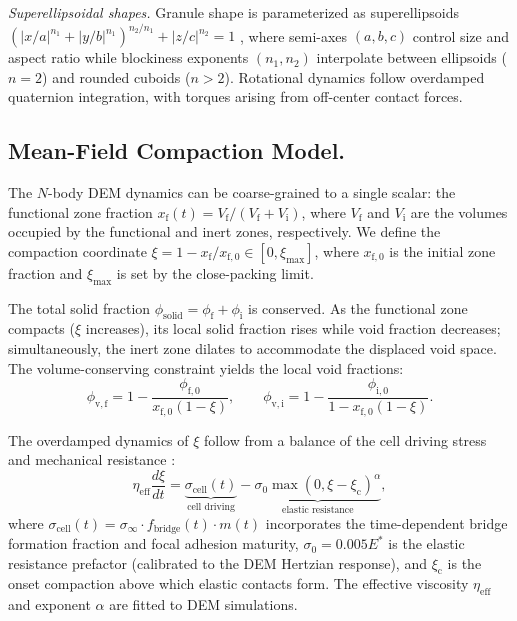 \documentclass[9pt,twocolumn,twoside]{pnas-new}
\newcommand{\phif}{\phi_\mathrm{f}}
\newcommand{\phii}{\phi_\mathrm{i}}
\newcommand{\xf}{x_\mathrm{f}}
\newcommand{\sigmacell}{\sigma_\mathrm{cell}}
\newcommand{\sigmazero}{\sigma_0}
\newcommand{\etaeff}{\eta_\mathrm{eff}}
\begin{document}
\textit{Superellipsoidal shapes.}
Granule shape is parameterized as superellipsoids
$\left(|x/a|^{n_1} + |y/b|^{n_1}\right)^{n_2/n_1} + |z/c|^{n_2} = 1$
\cite{Liu2025,Yuan2019}, where semi-axes $(a, b, c)$ control size and aspect
ratio while blockiness exponents $(n_1, n_2)$ interpolate between ellipsoids
($n = 2$) and rounded cuboids ($n > 2$). Rotational dynamics follow
overdamped quaternion integration, with torques arising from off-center
contact forces.

\subsection*{Mean-Field Compaction Model.}

The $N$-body DEM dynamics can be coarse-grained to a single scalar: the
functional zone fraction $\xf(t) = V_\mathrm{f}/(V_\mathrm{f} +
V_\mathrm{i})$, where $V_\mathrm{f}$ and $V_\mathrm{i}$ are the volumes
occupied by the functional and inert zones, respectively. We define the
compaction coordinate $\xi = 1 - \xf / x_{\mathrm{f},0} \in [0, \xi_\mathrm{max}]$,
where $x_{\mathrm{f},0}$ is the initial zone fraction and
$\xi_\mathrm{max}$ is set by the close-packing limit.

The total solid fraction $\phi_\mathrm{solid} = \phif + \phii$ is
conserved. As the functional zone compacts ($\xi$ increases), its local solid
fraction rises while void fraction decreases; simultaneously, the inert zone
dilates to accommodate the displaced void space. The volume-conserving
constraint yields the local void fractions:
%
\begin{equation}\label{eq:void}
  \phi_{\mathrm{v},\mathrm{f}} = 1 - \frac{\phi_\mathrm{f,0}}{x_{\mathrm{f},0}(1 - \xi)}, \qquad
  \phi_{\mathrm{v},\mathrm{i}} = 1 - \frac{\phi_\mathrm{i,0}}{1 - x_{\mathrm{f},0}(1 - \xi)}.
\end{equation}

The overdamped dynamics of $\xi$ follow from a balance of the cell driving
stress and mechanical resistance \cite{Kramers1940,Doi1986}:
%
\begin{equation}\label{eq:mf_ode}
  \etaeff \frac{d\xi}{dt} = \underbrace{\sigmacell(t)}_{\text{cell driving}}
  - \underbrace{\sigmazero \max(0, \xi - \xi_\mathrm{c})^\alpha}_{\text{elastic resistance}},
\end{equation}
%
where $\sigmacell(t) = \sigma_\infty \cdot f_\mathrm{bridge}(t) \cdot
m(t)$ incorporates the time-dependent bridge formation fraction and focal
adhesion maturity, $\sigmazero = 0.005 E^{*}$ is the elastic resistance
prefactor (calibrated to the DEM Hertzian response), and
$\xi_\mathrm{c}$ is the onset compaction above which elastic contacts form.
The effective viscosity $\etaeff$ and exponent $\alpha$ are fitted to
DEM simulations.
\end{document}
